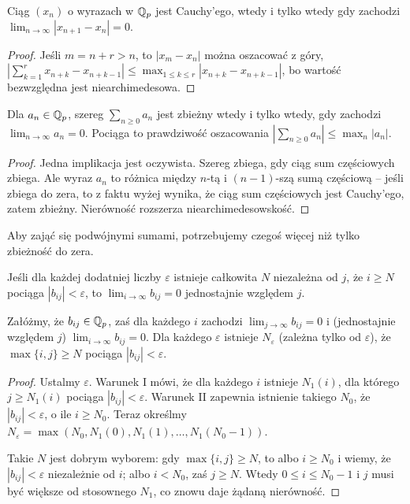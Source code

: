 \begin{fakt}
	Ciąg $(x_n)$ o wyrazach w $\mathbb{Q}_p$ jest Cauchy'ego, wtedy i tylko wtedy gdy zachodzi $\lim_{n\to \infty}|x_{n+1} - x_n| = 0$.
\end{fakt}

\begin{proof}
	Jeśli $m = n+r > n$, to $|x_m - x_n|$ można oszacować z góry,
	$\left|\sum_{k=1}^r x_{n+k} - x_{n+k-1}\right| \le \max_{1 \le k \le r} |x_{n+k}-x_{n+k-1}|$,
	bo wartość bezwzględna jest niearchimedesowa.
\end{proof}

\begin{fakt} \label{ingentis} %
	Dla $a_n \in \mathbb{Q}_p$, szereg $\sum_{n \ge 0} a_n$ jest zbieżny wtedy i tylko wtedy, gdy zachodzi $\lim_{n \to \infty} a_n = 0$.
	Pociąga to prawdziwość oszacowania $|\sum_{n \ge 0} a_n| \le \max_n |a_n|$.
\end{fakt}

\begin{proof}
	Jedna implikacja jest oczywista.
	Szereg zbiega, gdy ciąg sum częściowych zbiega.
	Ale wyraz $a_n$ to różnica między $n$-tą i $(n-1)$-szą sumą częściową -- jeśli zbiega do zera, to z faktu wyżej wynika, że ciąg sum częściowych jest Cauchy'ego, zatem zbieżny.
	Nierówność rozszerza niearchimedesowskość.
\end{proof}

Aby zająć się podwójnymi sumami, potrzebujemy czegoś więcej niż tylko zbieżność do zera.

\begin{definicja}
	Jeśli dla każdej dodatniej liczby $\varepsilon$ istnieje całkowita $N$ niezależna od $j$, że $i \ge N$ pociąga $|b_{ij}| < \varepsilon$, to $\lim_{i \to \infty} b_{ij} = 0$ {jednostajnie} względem $j$.
\end{definicja}

\begin{lemat} \label{veteris}
	Załóżmy, że $b_{ij} \in \mathbb{Q}_p$, zaś dla każdego $i$ zachodzi $\lim_{j\to \infty} b_{ij} = 0$ i (jednostajnie względem $j$) $\lim_{i \to \infty} b_{ij} = 0$. 
	Dla każdego $\varepsilon$ istnieje $N_\varepsilon$ (zależna tylko od $\varepsilon$), że $\max \{i, j\} \ge N$ pociąga $|b_{ij}| < \varepsilon$.
\end{lemat}

\begin{proof}
	Ustalmy $\varepsilon$.
	Warunek I mówi, że dla każdego $i$ istnieje $N_1(i)$, dla którego $j \ge N_1(i)$ pociąga $|b_{ij}| < \varepsilon$.
	Warunek II zapewnia istnienie takiego $N_0$, że $|b_{ij}| < \varepsilon$, o ile $i \ge N_0$.
	Teraz określmy $N_\varepsilon = \max(N_0, N_1(0), N_1(1), \ldots, N_1(N_0-1))$.

	Takie $N$ jest dobrym wyborem: gdy $\max \{i, j\} \ge N$, to albo $i \ge N_0$ i wiemy, że $|b_{ij}| < \varepsilon$ niezależnie od $i$; albo $ i < N_0$, zaś $j \ge N$.
	Wtedy $0 \le i \le N_0 - 1$ i $j$ musi być większe od stosownego $N_1$, co znowu daje żądaną nierówność.
\end{proof}

